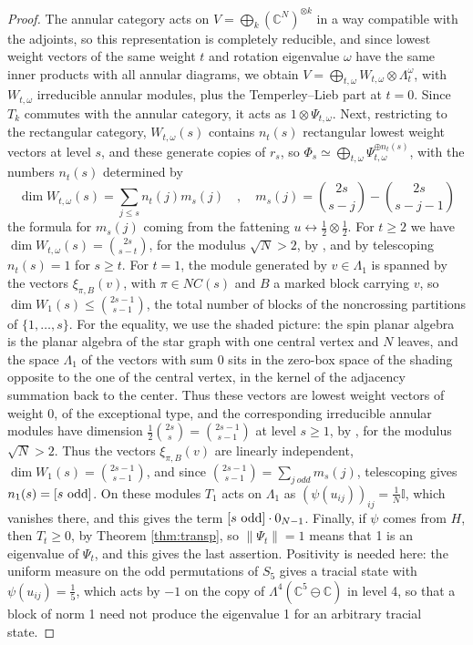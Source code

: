 \documentclass[11pt]{amsart}
\begin{document}
\begin{proof}
The annular category acts on $V=\bigoplus_k(\mathbb C^N)^{\otimes k}$ in a way compatible with the adjoints, so this representation is completely reducible, and since lowest weight vectors of the same weight $t$ and rotation eigenvalue $\omega$ have the same inner products with all annular diagrams, we obtain $V=\bigoplus_{t,\omega}W_{t,\omega}\otimes\Lambda_t^\omega$, with $W_{t,\omega}$ irreducible annular modules, plus the Temperley--Lieb part at $t=0$. Since $T_k$ commutes with the annular category, it acts as $1\otimes\Psi_{t,\omega}$. Next, restricting to the rectangular category, $W_{t,\omega}(s)$ contains $n_t(s)$ rectangular lowest weight vectors at level $s$, and these generate copies of $r_s$, so $\Phi_s\simeq\bigoplus_{t,\omega}\Psi_{t,\omega}^{\oplus n_t(s)}$, with the numbers $n_t(s)$ determined by
$$\dim W_{t,\omega}(s)=\sum_{j\leq s}n_t(j)m_s(j)\quad,\quad m_s(j)=\binom{2s}{s-j}-\binom{2s}{s-j-1}$$
the formula for $m_s(j)$ coming from the fattening $u\leftrightarrow\frac{1}{2}\otimes\frac{1}{2}$. For $t\geq2$ we have $\dim W_{t,\omega}(s)=\binom{2s}{s-t}$, for the modulus $\sqrt N>2$, by \cite[Proposition 5.3]{jo2}, and by telescoping $n_t(s)=1$ for $s\geq t$. For $t=1$, the module generated by $v\in\Lambda_1$ is spanned by the vectors $\xi_{\pi,B}(v)$, with $\pi\in NC(s)$ and $B$ a marked block carrying $v$, so $\dim W_1(s)\leq\binom{2s-1}{s-1}$, the total number of blocks of the noncrossing partitions of $\{1,\ldots,s\}$. For the equality, we use the shaded picture: the spin planar algebra is the planar algebra of the star graph with one central vertex and $N$ leaves, and the space $\Lambda_1$ of the vectors with sum 0 sits in the zero-box space of the shading opposite to the one of the central vertex, in the kernel of the adjacency summation back to the center. Thus these vectors are lowest weight vectors of weight 0, of the exceptional type, and the corresponding irreducible annular modules have dimension $\frac{1}{2}\binom{2s}{s}=\binom{2s-1}{s-1}$ at level $s\geq1$, by \cite[Proposition 5.21, Theorem 5.23]{jo2}, for the modulus $\sqrt N>2$. Thus the vectors $\xi_{\pi,B}(v)$ are linearly independent, $\dim W_1(s)=\binom{2s-1}{s-1}$, and since $\binom{2s-1}{s-1}=\sum_{j\ odd}m_s(j)$, telescoping gives $n_1(s)=[s\ {\rm odd}]$. On these modules $T_1$ acts on $\Lambda_1$ as $(\psi(u_{ij}))_{ij}=\frac{1}{N}\mathbb I$, which vanishes there, and this gives the term $[s\ {\rm odd}]\cdot0_{N-1}$. Finally, if $\psi$ comes from $H$, then $T_t\geq0$, by Theorem \ref{thm:transp}, so $\|\Psi_t\|=1$ means that 1 is an eigenvalue of $\Psi_t$, and this gives the last assertion. Positivity is needed here: the uniform measure on the odd permutations of $S_5$ gives a tracial state with $\psi(u_{ij})=\frac{1}{5}$, which acts by $-1$ on the copy of $\Lambda^4(\mathbb C^5\ominus\mathbb C)$ in level 4, so that a block of norm 1 need not produce the eigenvalue 1 for an arbitrary tracial state.
\end{proof}
\end{document}
